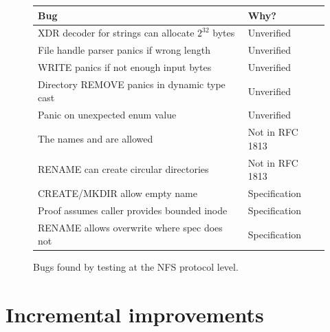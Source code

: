 \begin{figure}
  \begin{center}
  \begin{tabular}{@{}p{8cm}p{2.7cm}@{}}
    \toprule
    \textbf{Bug} & \textbf{Why?} \\
    \midrule
    XDR decoder for strings can allocate $2^{32}$ bytes & Unverified \\
    File handle parser panics if wrong length & Unverified \\
    WRITE panics if not enough input bytes & Unverified \\
    Directory REMOVE panics in dynamic type cast & Unverified \\
    Panic on unexpected enum value & Unverified \\
    The names \cc{.} and \cc{..} are allowed & Not in RFC 1813 \\
    RENAME can create circular directories & Not in RFC 1813 \\
    CREATE/MKDIR allow empty name & Specification \\
    Proof assumes caller provides bounded inode & Specification \\
    RENAME allows overwrite where spec does not & Specification \\
    \bottomrule
  \end{tabular}
  \end{center}
  \caption{Bugs found by testing at the NFS protocol level.}
  \label{fig:daisynfs-bugs}
\end{figure}


\section{Incremental improvements}
\label{sec:eval:incremental}

